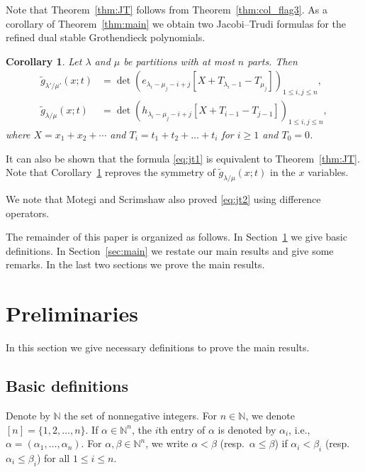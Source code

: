 \documentclass[12pt]{amsart}
\numberwithin{equation}{section}
\newtheorem{cor}[thm]{Corollary}
\theoremstyle{definition}
\newcommand\wg{\widetilde{g}}
\newcommand\NN{\mathbb{N}}
\begin{document}
Note that Theorem~\ref{thm:JT} follows from Theorem~\ref{thm:col_flag3}. As a
corollary of Theorem~\ref{thm:main} we obtain two Jacobi--Trudi formulas for the
refined dual stable Grothendieck polynomials.


\begin{cor}\label{cor:main}
Let   $\lambda$ and $\mu$ be partitions with at most $n$ parts. Then
\begin{align}
  \label{eq:jt1}
\wg_{\lambda'/\mu'}(x;t)&= \det \left(
      e_{\lambda_i-\mu_j-i+j}[X+T_{\lambda_i-1}-T_{\mu_j}]
      \right)_{1\le i,j\le n},\\
  \label{eq:jt2}
\wg_{\lambda/\mu}(x;t)&= \det \left(
      h_{\lambda_i-\mu_j-i+j}[X+T_{i-1}-T_{j-1}]
      \right)_{1\le i,j\le n},
\end{align}
where $X=x_1+x_2+\cdots$ and $T_i=t_1+t_2+\dots+t_i$ for $i\ge1$ and $T_0=0$.
\end{cor}

It can also be shown that the formula \eqref{eq:jt1} is equivalent to
Theorem~\ref{thm:JT}. Note that Corollary~\ref{cor:main} reproves the symmetry
of $\wg_{\lambda/\mu}(x;t)$ in the $x$ variables.

We note that Motegi and Scrimshaw \cite{Motegi} also proved \eqref{eq:jt2} using
difference operators.



The remainder of this paper is organized as follows. In
Section~\ref{sec:preliminaries} we give basic definitions. In
Section~\ref{sec:main} we restate our main results and give some remarks. In the
last two sections we prove the main results.

\medskip


\section{Preliminaries}
\label{sec:preliminaries}


In this section we give necessary definitions to prove the main results.


\subsection{Basic definitions}
\label{sec:basic-definitions}



Denote by $\NN$ the set of nonnegative integers. For $n\in\NN$, we denote
$[n]=\{1,2,\dots,n\}$. If $\alpha\in\NN^n$, the $i$th entry of $\alpha$ is
denoted by $\alpha_i$, i.e., $\alpha=(\alpha_1,\dots,\alpha_n)$. For
$\alpha,\beta\in\NN^n$, we write $\alpha<\beta$ (resp.~$\alpha\le \beta$) if
$\alpha_i<\beta_i$ (resp.~$\alpha_i\le\beta_i$) for all $1\le i\le n$.
\end{document}
